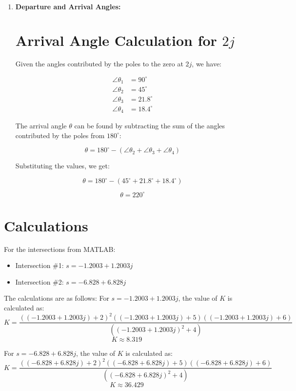 \documentclass{article}
\begin{document}
\begin{enumerate}
    \item \textbf{Departure and Arrival Angles:}
\section*{Arrival Angle Calculation for \( 2j \)}

Given the angles contributed by the poles to the zero at \( 2j \), we have:

\begin{align*}
\angle \theta_1 &= 90^\circ \\
\angle \theta_2 &= 45^\circ \\
\angle \theta_3 &= 21.8^\circ \\
\angle \theta_4 &= 18.4^\circ
\end{align*}

The arrival angle \( \theta \) can be found by subtracting the sum of the angles contributed by the poles from \( 180^\circ \):

\[
\theta = 180^\circ - (\angle \theta_2 + \angle \theta_3 + \angle \theta_4)
\]

Substituting the values, we get:

\[
\theta = 180^\circ - (45^\circ + 21.8^\circ + 18.4^\circ)
\]

\[
\theta = 220^\circ
\]

\end{enumerate}

\section*{Calculations}
For the intersections from MATLAB:

\begin{itemize}
    \item Intersection \#1: \( s = -1.2003 + 1.2003j \)
    \item Intersection \#2: \( s = -6.828 + 6.828j \)
\end{itemize}
\noindent
The calculations are as follows:
For \( s = -1.2003 + 1.2003j \), the value of \( K \) is calculated as:
\[ K = \frac{((-1.2003 + 1.2003j)+2)^2((-1.2003 + 1.2003j)+5)((-1.2003 + 1.2003j)+6)}{((-1.2003 + 1.2003j)^2+4)} \]
\[ K \approx 8.319 \]

For \( s = -6.828 + 6.828j \), the value of \( K \) is calculated as:
\[ K = \frac{((-6.828 + 6.828j)+2)^2((-6.828 + 6.828j)+5)((-6.828 + 6.828j)+6)}{((-6.828 + 6.828j)^2+4)} \]
\[ K \approx 36.429 \]
\end{document}
